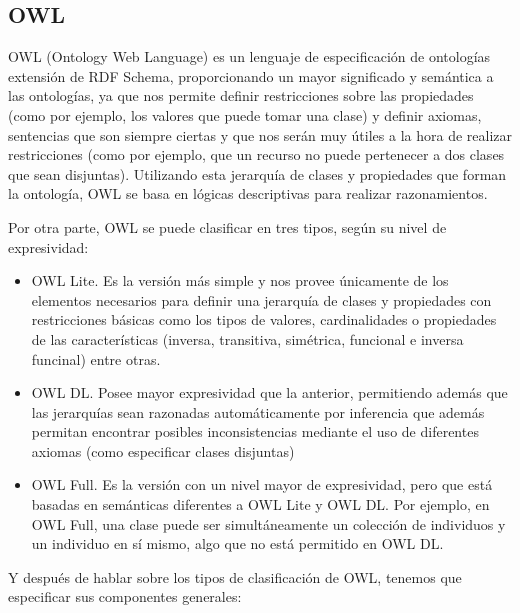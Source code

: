\subsection{OWL}

OWL (Ontology Web Language) es un lenguaje de especificación de ontologías extensión de RDF Schema, proporcionando un mayor significado y semántica a las ontologías, ya que nos permite definir restricciones sobre las propiedades (como por ejemplo, los valores que puede tomar una clase) y definir axiomas, sentencias que son siempre ciertas y que nos serán muy útiles a la hora de realizar restricciones (como por ejemplo, que un recurso no puede pertenecer a dos clases que sean disjuntas). Utilizando esta jerarquía de clases y propiedades que forman la ontología, OWL se basa en lógicas  descriptivas para realizar razonamientos.

\newpage
Por otra parte, OWL se puede clasificar en tres tipos, según su nivel de expresividad:

\begin{itemize}
	\item OWL Lite. Es la versión más simple y nos provee únicamente de los elementos necesarios para definir una jerarquía de clases y propiedades con restricciones básicas como los tipos de valores, cardinalidades o propiedades de las características (inversa, transitiva, simétrica, funcional e inversa funcinal) entre otras.
	\item OWL DL. Posee mayor expresividad que la anterior, permitiendo además que las jerarquías sean razonadas automáticamente por inferencia que además permitan encontrar posibles inconsistencias mediante el uso de diferentes axiomas (como especificar clases disjuntas)
	\item OWL Full. Es la versión con un nivel mayor de expresividad, pero que está basadas en semánticas diferentes a OWL Lite y OWL DL. Por ejemplo, en OWL Full, una clase puede ser simultáneamente un colección de individuos y un individuo en sí mismo, algo que no está permitido en OWL DL.
\end{itemize}

Y después de hablar sobre los tipos de clasificación de OWL, tenemos que especificar sus componentes generales:

